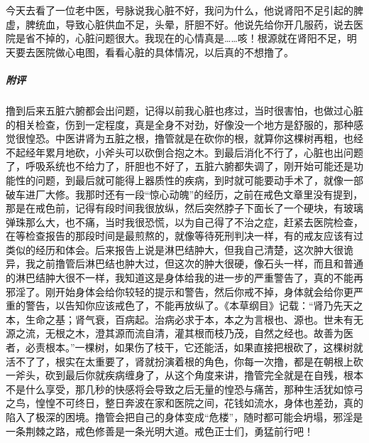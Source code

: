 \begin{case}
    今天去看了一位老中医，号脉说我心脏不好，我问为什么，他说肾阳不足引起的脾虚，脾统血，导致心脏供血不足，头晕，肝胆不好。他说先给你开几服药，说去医院是省不掉的，心脏问题很大。我现在的心情真是……咳！根源就在肾阳不足，明天要去医院做心电图，看看心脏的具体情况，以后真的不想撸了。
    \subparagraph{附评} 撸到后来五脏六腑都会出问题，记得以前我心脏也疼过，当时很害怕，也做过心脏的相关检查，伤到一定程度，真是全身不对劲，好像没一个地方是舒服的，那种感觉很惶恐。中医讲肾为五脏之根，撸管就是在砍你的根，就算你这棵树再粗，也经不起经年累月地砍，小斧头可以砍倒合抱之木。到最后消化不行了，心脏也出问题了，呼吸系统也不给力了，肝胆也不好了，五脏六腑都失调了，刚开始可能还是功能性的问题，到最后就可能得上器质性的疾病，到时就可能要动手术了，就像一部破车进厂大修。我那时还有一段“惊心动魄”的经历，之前在戒色文章里没有提到，那是在戒色前，记得有段时间我很放纵，然后突然脖子下面长了一个硬块，有玻璃弹珠那么大，也不痛，当时我很恐慌，以为自己得了不治之症，赶紧去医院检查，在等检查报告的那段时间是最煎熬的，就像等待死刑判决一样，有的戒友应该有过类似的经历和体会。后来报告上说是淋巴结肿大，但我自己清楚，这次肿大很诡异，我之前撸管后淋巴结也肿大过，但这次的肿大很硬，像石头一样，而且和普通的淋巴结肿大很不一样，我知道这是身体给我的进一步的严重警告了，真的不能再邪淫了。刚开始身体会给你较轻的提示和警告，然后你戒不掉，身体就会给你更严重的警告，以告知你应该戒色了，不能再放纵了。《本草纲目》记载：“肾乃先天之本，生命之基；肾气衰，百病起。治病必求于本，本之为言根也、源也。世未有无源之流，无根之木，澄其源而流自清，灌其根而枝乃茂，自然之经也。故善为医者，必责根本。”一棵树，如果伤了枝干，它还能活，如果直接把根砍了，这棵树就活不了了，根实在太重要了，肾就扮演着根的角色，你每一次撸，都是在朝根上砍一斧头，砍到最后你就疾病缠身了，从这个角度来讲，撸管完全就是在自残，根本不是什么享受，那几秒的快感将会导致之后无量的惶恐与痛苦，那种生活犹如惊弓之鸟，惶惶不可终日，整日奔波在家和医院之间，花钱如流水，身体也差劲，真的陷入了极深的困境。撸管会把自己的身体变成“危楼”，随时都可能会坍塌，邪淫是一条荆棘之路，戒色修善是一条光明大道。戒色正士们，勇猛前行吧！
\end{case}

